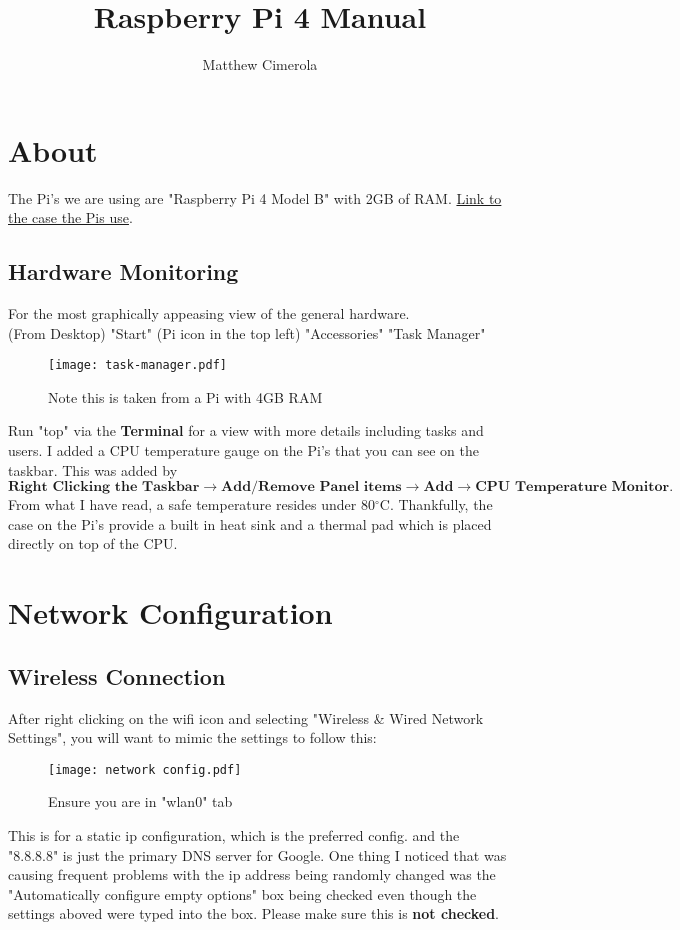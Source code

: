 \documentclass[12pt]{extarticle}
\author{Matthew Cimerola}
\title{Raspberry Pi 4 Manual}
\begin{document}
\maketitle

\tableofcontents
\newpage
\section{About}
The Pi's we are using are "Raspberry Pi 4 Model B" with 2GB of RAM. \href{https://www.amazon.com/Flirc-Raspberry-Pi-Case-Silver/dp/B07WG4DW52/ref=sr_1_5?keywords=Raspberry+Pi+4+Case&qid=1658852531&sr=8-5}{Link to the case the Pis use}. 
\subsection{Hardware Monitoring}
For the most graphically appeasing view of the general hardware.\\ 
(From Desktop) "Start" (Pi icon in the top left) \rightarrow "Accessories" \rightarrow "Task Manager" 

\begin{figure}[ht]
    \centering
    \texttt{[image: task-manager.pdf]}
    \caption{Note this is taken from a Pi with 4GB RAM}
\end{figure}
Run "top" via the \textbf{Terminal} for a view with more details including tasks and users. I added a CPU temperature gauge on the Pi's that you can see on the taskbar. This was added by $ \textbf{Right Clicking the Taskbar} \rightarrow \textbf{Add/Remove Panel items} \rightarrow \textbf{Add} \rightarrow \textbf{CPU Temperature Monitor}. $ From what I have read, a safe temperature resides under 80$^{\circ}$C. Thankfully, the case on the Pi's provide a built in heat sink and a thermal pad which is placed directly on top of the CPU.


\newpage
\section{Network Configuration}
\subsection{Wireless Connection}
After right clicking on the wifi icon and selecting "Wireless \& Wired Network Settings", you will want to mimic the settings to follow this:
\begin{figure}[ht]
    \centering
    \texttt{[image: network config.pdf]}
    \caption{Ensure you are in "wlan0" tab}
\end{figure}
\newline This is for a static ip configuration, which is the preferred config. and the "8.8.8.8" is just the primary DNS server for Google. One thing I noticed that was causing frequent problems with the ip address being randomly changed was the "Automatically configure empty options" box being checked even though the settings aboved were typed into the box. Please make sure this is \textbf{not checked}.
\end{document}
